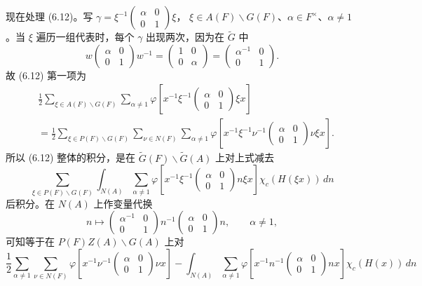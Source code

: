 现在处理 (6.12)。写
$\gamma=\xi^{-1}\left(\begin{smallmatrix}\alpha&0\\0&1\end{smallmatrix}\right)\xi$，
$\xi\in A(F)\backslash G(F)$、$\alpha\in F^\times$、$\alpha\ne1$。当 $\xi$ 遍历一组代表时，每个
$\gamma$ 出现两次，因为在 $\widetilde G$ 中
\[
 w\begin{pmatrix}\alpha&0\\0&1\end{pmatrix}w^{-1}
 =\begin{pmatrix}1&0\\0&\alpha\end{pmatrix}
 =\begin{pmatrix}\alpha^{-1}&0\\0&1\end{pmatrix}.
\]
故 (6.12) 第一项为
\[
\begin{aligned}
 &\frac12\sum_{\xi\in A(F)\backslash G(F)}\sum_{\alpha\ne1}
 \varphi\!\left[x^{-1}\xi^{-1}\begin{pmatrix}\alpha&0\\0&1\end{pmatrix}\xi x\right]\\
 &=\frac12\sum_{\xi\in P(F)\backslash G(F)}\sum_{\nu\in N(F)}\sum_{\alpha\ne1}
 \varphi\!\left[x^{-1}\xi^{-1}\nu^{-1}\begin{pmatrix}\alpha&0\\0&1\end{pmatrix}\nu\xi x\right].
\end{aligned}
\]
所以 (6.12) 整体的积分，是在 $\widetilde G(F)\backslash\widetilde G(A)$ 上对上式减去
\[
 \sum_{\xi\in P(F)\backslash G(F)}\int_{N(A)}\sum_{\alpha\ne1}
 \varphi\!\left[x^{-1}\xi^{-1}\begin{pmatrix}\alpha&0\\0&1\end{pmatrix}n\xi x\right]
 \chi_c(H(\xi x))\,dn
\]
后积分。在 $N(A)$ 上作变量代换
\[
 n\longmapsto\begin{pmatrix}\alpha^{-1}&0\\0&1\end{pmatrix}n^{-1}
 \begin{pmatrix}\alpha&0\\0&1\end{pmatrix}n,\qquad\alpha\ne1,
\]
可知等于在 $P(F)Z(A)\backslash G(A)$ 上对
\[
 \frac12\sum_{\alpha\ne1}\sum_{\nu\in N(F)}
 \varphi\!\left[x^{-1}\nu^{-1}\begin{pmatrix}\alpha&0\\0&1\end{pmatrix}\nu x\right]
 -\int_{N(A)}\sum_{\alpha\ne1}\varphi\!\left[x^{-1}n^{-1}\begin{pmatrix}\alpha&0\\0&1\end{pmatrix}nx\right]
 \chi_c(H(x))\,dn
\]

